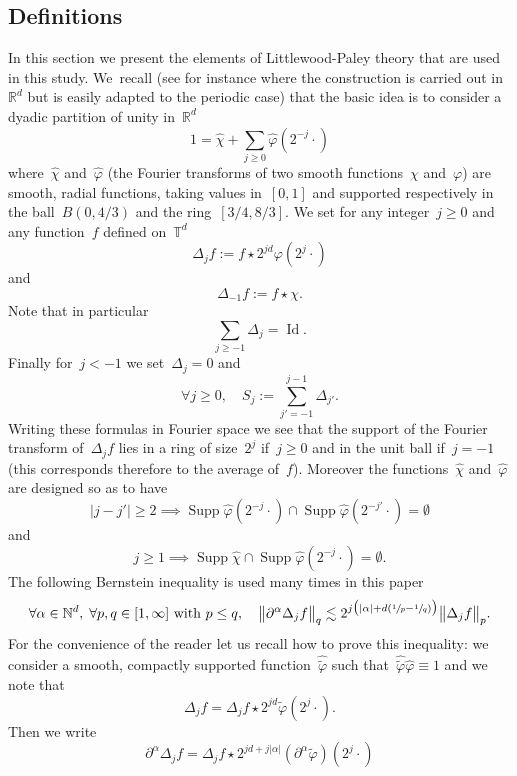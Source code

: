 \documentclass[JEP,XML,SOM,Unicode,published]{cedram}
\DeclareMathOperator{\Supp}{Supp}
\theoremstyle{definition}
\newcommand\R{\mathbb{R}}
\newcommand\N{\mathbb{N}}
\newcommand\T{\mathbb{T}}
\DeclareMathOperator\Id{Id}
\begin{document}
\subsection{Definitions}
In this section we present the elements of Littlewood-Paley theory that are used in this study. We~recall (see for instance \cite{BCD} where the construction is carried out in~$\R^d$ but is easily adapted to the periodic case) that the basic idea is to consider a dyadic partition of unity in~$\R^d$
\[
1 = \widehat\chi + \sum_{j \geq 0} \widehat \varphi (2^{-j} \cdot)
\]
where~$\widehat\chi$ and~$\widehat\varphi$ (the Fourier transforms of two smooth functions~$\chi$ and~$\varphi$) are smooth, radial functions, taking values in~$[0,1]$ and supported respectively in the ball~$B(0,4/3)$ and the ring~$[3/4,8/3]$.
We set for any integer~$j \geq 0$ and any function~$f$ defined on~$\T^d$
\begin{equation}\label{eq:def Delta j}
\Delta_j f:= f \star 2^{jd} \varphi (2^j \cdot)
\end{equation}
and
\[
\Delta_{-1} f:= f \star \chi.
\]
Note that in particular
\[
\sum_{j \geq -1}\Delta_j = \Id.
\]
Finally for~$j < -1$ we set~$\Delta_{ j} = 0$ and
\[
\forall j \geq 0, \quad S_j:= \sum_{j'=-1}^{j-1}\Delta_{j'}.
\]
Writing these formulas in Fourier space we see that the support of the Fourier transform of~$ \Delta_j f$ lies in a ring of size~$2^j$
if~$j \geq 0$ and in the unit ball if~$j = -1$ (this corresponds therefore to the average of~$f$). Moreover the functions~$\widehat\chi$ and~$\widehat\varphi$ are designed so as to have
\[
|j-j' | \geq 2 \implies \Supp \widehat \varphi (2^{-j} \cdot) \cap \Supp \widehat \varphi (2^{-j'} \cdot) = \emptyset
\]
and
\[
j \geq 1 \implies \Supp \widehat \chi \cap \Supp \widehat \varphi (2^{-j} \cdot) = \emptyset.
\]
The following Bernstein inequality is used many times in this paper
\begin{equation}\label{eq:bernstein}
\forall \alpha \in \N^d, \; \forall p,q\in[1,\infty]\text{ with }p\leq q, \quad \big\|\partial^\alpha \Delta_j f \big\|_{q} \lesssim 2^{j \bigl(|\alpha| + d (\sfrac1p-\sfrac1q)\bigr)} \big\|\Delta_j f\big\|_{p}.
\end{equation}
For the convenience of the reader let us recall how to prove this inequality: we consider a smooth, compactly supported function~$\widehat{\widetilde \varphi}$ such that~$
\widehat{\widetilde \varphi }\widehat \varphi \equiv 1$ and we note that
\[
\Delta_j f = \Delta_j f \star 2^{jd} \widetilde\varphi (2^j \cdot).
\]
Then we write
\[
\partial^\alpha \Delta_jf = \Delta_j f \star 2^{jd+j|\alpha|} (\partial^\alpha\widetilde\varphi) (2^j \cdot)
\]
\end{document}
